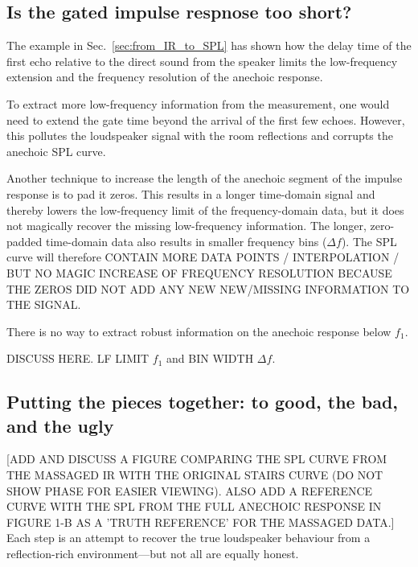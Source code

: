 \documentclass[12pt,a4paper]{article}
\providecommand{\seclabel}[1]{\label{sec:#1}}
\providecommand{\secn}[1]{Sec.~\ref{sec:#1}}
\begin{document}
\subsection{Is the gated impulse respnose too short?}\seclabel{zeropadding}
The example in \secn{from_IR_to_SPL} has shown how the delay time of the first echo relative to the direct sound from the speaker limits the low-frequency extension and the frequency resolution of the anechoic response. 

To extract more low-frequency information from the measurement, one would need to extend the gate time beyond the arrival of the first few echoes. However, this pollutes the loudspeaker signal with the room reflections and corrupts the anechoic SPL curve. 

Another technique to increase the length of the anechoic segment of the impulse response is to pad it zeros. This results in a longer time-domain signal and thereby lowers the low-frequency limit of the frequency-domain data, but it does not magically recover the missing low-frequency information. The longer, zero-padded time-domain data also results in smaller frequency bins ($\Delta f$). The SPL curve will therefore CONTAIN MORE DATA POINTS / INTERPOLATION / BUT NO MAGIC INCREASE OF FREQUENCY RESOLUTION BECAUSE THE ZEROS DID NOT ADD ANY NEW NEW/MISSING INFORMATION TO THE SIGNAL.

There is no way to extract robust information on the anechoic response below $f_1$.


DISCUSS HERE. LF LIMIT $f_1$ and BIN WIDTH $\Delta f$.

\subsection{Putting the pieces together: to good, the bad, and the ugly}
[ADD AND DISCUSS A FIGURE COMPARING THE SPL CURVE FROM THE MASSAGED IR WITH THE ORIGINAL STAIRS CURVE (DO NOT SHOW PHASE FOR EASIER VIEWING). ALSO ADD A REFERENCE CURVE WITH THE SPL FROM THE FULL ANECHOIC RESPONSE IN FIGURE 1-B AS A 'TRUTH REFERENCE' FOR THE MASSAGED DATA.]
Each step is an attempt to recover the true loudspeaker behaviour from a reflection-rich environment—but not all are equally honest.
\end{document}
